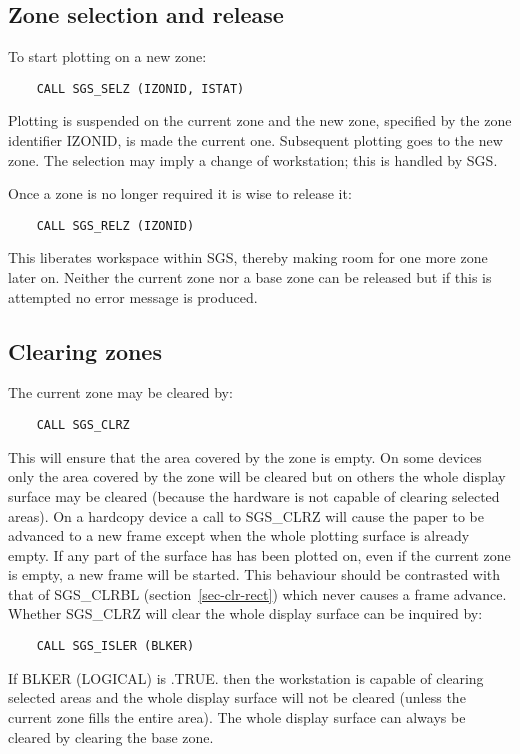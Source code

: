 \subsection {Zone selection and release}

To start plotting on a new zone:
\begin{verbatim}
    CALL SGS_SELZ (IZONID, ISTAT)
\end{verbatim}
Plotting is suspended on the current zone and the new
zone, specified by the zone identifier IZONID, is made
the current one.  Subsequent plotting goes to the new
zone.  The selection may imply a change of workstation;  this is 
handled by SGS.

Once a zone is no longer required it is wise to release it:
\begin{verbatim}
    CALL SGS_RELZ (IZONID)
\end{verbatim}
This liberates workspace within SGS, thereby making
room for one more zone later on.  Neither the current zone nor a base zone
can be released but if this is attempted no error message is produced.

\subsection {Clearing zones}

The current zone may be cleared by:
\begin{verbatim}
    CALL SGS_CLRZ
\end{verbatim}
This will ensure that the area covered by the zone is empty.  On some devices
only the area covered by the zone will be cleared but on others the whole
display surface may be cleared (because the hardware is 
not capable of clearing selected
areas).  On a hardcopy device a call to SGS\_CLRZ will cause the paper to 
be advanced to a new
frame except when the whole plotting surface is already empty.  If any part of
the surface has has been plotted on, even if the current zone is empty, a new
frame will be started.  This behaviour should be contrasted with 
that of SGS\_CLRBL (section~\ref{sec-clr-rect}) which
never causes a frame advance.  Whether SGS\_CLRZ will clear the whole display
surface can be inquired by:
\begin{verbatim}
    CALL SGS_ISLER (BLKER)
\end{verbatim}
If BLKER (LOGICAL) is .TRUE. then the workstation is capable of 
clearing selected areas and the whole display surface will not be cleared 
(unless the current zone fills
the entire area).  The whole display surface can always be cleared by 
clearing the base zone.

